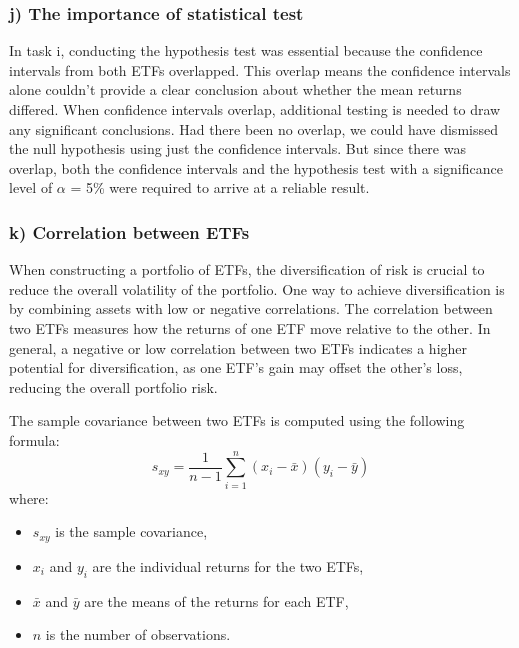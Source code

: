 \documentclass{rapport}
\begin{document}
\subsubsection*{\textbf{j)} The importance of statistical test}
In task i, conducting the hypothesis test was essential because the confidence intervals from both ETFs overlapped. This overlap means the confidence intervals alone couldn't provide a clear conclusion about whether the mean returns differed. When confidence intervals overlap, additional testing is needed to draw any significant conclusions. Had there been no overlap, we could have dismissed the null hypothesis using just the confidence intervals. But since there was overlap, both the confidence intervals and the hypothesis test with a significance level of 
$\alpha$ = 5\% were required to arrive at a reliable result.


\subsubsection*{\textbf{k)} Correlation between ETFs}

\noindent
When constructing a portfolio of ETFs, the diversification of risk is crucial to reduce the overall volatility of the portfolio. 
One way to achieve diversification is by combining assets with low or negative correlations. 
The correlation between two ETFs measures how the returns of one ETF move relative to the other. 
In general, a negative or low correlation between two ETFs indicates a higher potential for diversification, as one ETF’s gain may offset the other’s loss, reducing the overall portfolio risk.

\noindent
The sample covariance between two ETFs is computed using the following formula:
\[
s_{xy} = \frac{1}{n-1} \sum_{i=1}^n (x_i - \bar{x})(y_i - \bar{y})
\]
where:
\begin{itemize}
    \item \( s_{xy} \) is the sample covariance,
    \item \( x_i \) and \( y_i \) are the individual returns for the two ETFs,
    \item \( \bar{x} \) and \( \bar{y} \) are the means of the returns for each ETF,
    \item \( n \) is the number of observations.
\end{itemize}
\end{document}
